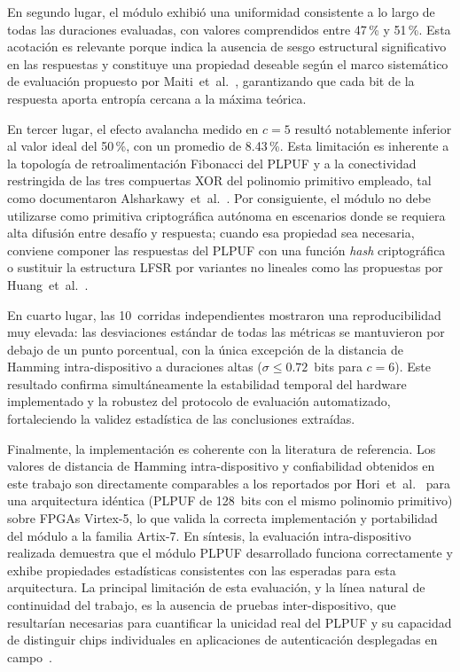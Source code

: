 En segundo lugar, el módulo exhibió una uniformidad consistente a lo largo
de todas las duraciones evaluadas, con valores comprendidos entre 47\,\% y
51\,\%. Esta acotación es relevante porque indica la ausencia de sesgo
estructural significativo en las respuestas y constituye una propiedad
deseable según el marco sistemático de evaluación propuesto por
Maiti~et~al.~\cite{maiti_2012_systematic}, garantizando que cada bit de la
respuesta aporta entropía cercana a la máxima teórica.

En tercer lugar, el efecto avalancha medido en $c = 5$ resultó
notablemente inferior al valor ideal del 50\,\%, con un promedio de
8.43\,\%. Esta limitación es inherente a la topología de retroalimentación
Fibonacci del PLPUF y a la conectividad restringida de las tres compuertas
XOR del polinomio primitivo empleado, tal como documentaron
Alsharkawy~et~al.~\cite{alsharkawy_2024_plpufs}. Por consiguiente, el módulo
no debe utilizarse como primitiva criptográfica autónoma en escenarios donde
se requiera alta difusión entre desafío y respuesta; cuando esa propiedad
sea necesaria, conviene componer las respuestas del PLPUF con una función
\textit{hash} criptográfica o sustituir la estructura LFSR por variantes no
lineales como las propuestas por Huang~et~al.~\cite{huang_2024_nlfsr}.

En cuarto lugar, las 10~corridas independientes mostraron una
reproducibilidad muy elevada: las desviaciones estándar de todas las
métricas se mantuvieron por debajo de un punto porcentual, con la única
excepción de la distancia de Hamming intra-dispositivo a duraciones altas
($\sigma \leq 0.72$~bits para $c = 6$). Este resultado confirma simultáneamente
la estabilidad temporal del hardware implementado y la robustez del
protocolo de evaluación automatizado, fortaleciendo la validez estadística
de las conclusiones extraídas.

Finalmente, la implementación es coherente con la literatura de referencia.
Los valores de distancia de Hamming intra-dispositivo y confiabilidad
obtenidos en este trabajo son directamente comparables a los reportados por
Hori~et~al.~\cite{hori_2011_pseudolfsr} para una arquitectura idéntica
(PLPUF de 128~bits con el mismo polinomio primitivo) sobre FPGAs Virtex-5,
lo que valida la correcta implementación y portabilidad del módulo a la
familia Artix-7. En síntesis, la evaluación intra-dispositivo realizada
demuestra que el módulo PLPUF desarrollado funciona correctamente y exhibe
propiedades estadísticas consistentes con las esperadas para esta
arquitectura. La principal limitación de esta evaluación, y la línea natural
de continuidad del trabajo, es la ausencia de pruebas inter-dispositivo, que
resultarían necesarias para cuantificar la unicidad real del PLPUF y su
capacidad de distinguir chips individuales en aplicaciones de autenticación
desplegadas en
campo~\cite{maiti_2012_systematic, wilde_2020_confidence}.

